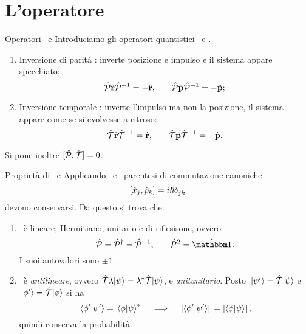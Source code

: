 \section{L'operatore \hPT}
\begin{frame}{Operatori \hP\ e \hT}
    Introduciamo gli operatori quantistici \hP\ e \hT.
    \begin{enumerate}[label=\mybullet]
        \pause
        \item Inversione di parità \hP : inverte posizione e impulso e il sistema appare specchiato:
            \begin{equation*}
                \mathcal{\hat{P}}\hat{\vb{r}}\mathcal{\hat{P}}^{-1} = -\hat{\vb{r}}
                \text{,}
                \qquad
                \mathcal{\hat{P}}\hat{\vb{p}}\mathcal{\hat{P}}^{-1} = -\hat{\vb{p}}
                \text{;}
            \end{equation*}
        \pause
        \item Inversione temporale \hT : inverte l'impulso ma non la posizione, il sistema appare come se si evolvesse a ritroso:
            \begin{equation*}
                \mathcal{\hat{T}}\hat{\vb{r}}\mathcal{\hat{T}}^{-1} = \hat{\vb{r}}
                \text{,}
                \qquad
                \mathcal{\hat{T}}\hat{\vb{p}}\mathcal{\hat{T}}^{-1} = -\hat{\vb{p}}
                \text{.}
            \end{equation*}
    \end{enumerate}
    \pause
    Si pone inoltre $\comm*{\hP}{\hT}\! = 0$.
\end{frame}

\begin{frame}{Proprietà di \hP\ e \hT}
    Applicando \hP\ e \hT\ parentesi di commutazione canoniche
    \begin{equation*}
        \comm*{\hx_j}{\hp_k}\! = i\hbar\tensor{\delta}{_j_k}
    \end{equation*}
    devono conservarsi. Da questo si trova che:
    \begin{enumerate}[label=\mybullet]
        \pause
        \item \hP\ è lineare, Hermitiano, unitario e di riflesisone, ovvero
            \begin{equation*}
                \hP = \hP^\dag = \hP^{-1}
                \mycomma\qquad
                \hP^2 = \hidM
                \myperiod
            \end{equation*}
        I suoi autovalori sono $\pm1$.
        \pause
        \item \hT\ è \emph{antilineare}, ovvero $\mathcal{\hat{T}}\lambda\!\ket{\psi} = \lambda^*\mathcal{\hat{T}}\!\ket{\psi}$, e \emph{anitunitario}. Posto $\ket*{\psi'} = \mathcal{\hat{T}}\!\ket{\psi}$ e $\ket*{\phi'} = \mathcal{\hat{T}}\!\ket{\phi}$ si ha 
            \begin{equation*}
                \braket*{\phi'}{\psi'} = \braket*{\phi}{\psi}^*
                \quad\implies\quad 
                \abs*{\!\braket*{\phi'}{\psi'}} = \abs*{\!\braket*{\phi}{\psi}}
                \text{,}
            \end{equation*}
        quindi conserva la probabilità.
    \end{enumerate}
\end{frame}

